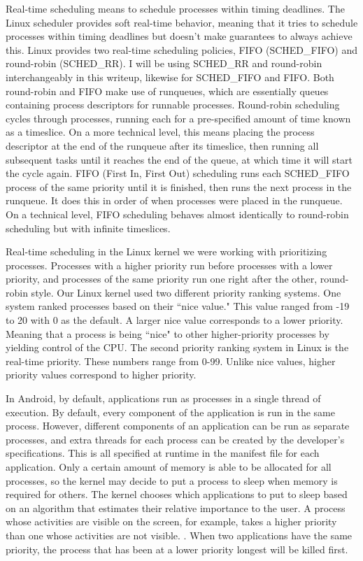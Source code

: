 \documentclass[letterpaper,10pt,titlepage]{article}
\newcommand{\ignore}[2]{\hspace{0in}#2} %
\begin{document}
Real-time scheduling means to schedule processes within timing deadlines. The Linux scheduler provides soft real-time behavior, meaning that it tries to schedule processes within timing deadlines but doesn't make guarantees to always achieve this. Linux provides two real-time scheduling policies, FIFO (SCHED\_FIFO) and round-robin (SCHED\_RR)\ignore{[Source: Linux Kernel Development, pg. 64]}. I will be using SCHED\_RR and round-robin interchangeably in this writeup, likewise for SCHED\_FIFO and FIFO. Both round-robin and FIFO make use of runqueues, which are essentially queues containing process descriptors for runnable processes. Round-robin scheduling cycles through processes, running each for a pre-specified amount of time known as a timeslice. On a more technical level, this means placing the process descriptor at the end of the runqueue after its timeslice, then running all subsequent tasks until it reaches the end of the queue, at which time it will start the cycle again. FIFO (First In, First Out) scheduling runs each SCHED\_FIFO process of the same priority until it is finished, then runs the next process in the runqueue. It does this in order of when processes were placed in the runqueue. On a technical level, FIFO scheduling behaves almost identically to round-robin scheduling but with infinite timeslices. \cite{Bovet}

Real-time scheduling in the Linux kernel we were working with prioritizing processes. Processes with a higher priority run before processes with a lower priority, and processes of the same priority run one right after the other, round-robin style. Our Linux kernel used two different priority ranking systems. One system ranked processes based on their ``nice value." This value ranged from -19 to 20 with 0 as the default. A larger nice value corresponds to a lower priority. Meaning that a process is being ``nice" to other higher-priority processes by yielding control of the CPU. The second priority ranking system in Linux is the real-time priority. These numbers range from 0-99. Unlike nice values, higher priority values correspond to higher priority. \cite{Love}

In Android, by default, applications run as processes in a single thread of execution. By default, every component of the application is run in the same process. However, different components of an application can be run as separate processes, and extra threads for each process can be created by the developer's specifications. This is all specified at runtime in the manifest file for each application. Only a certain amount of memory is able to be allocated for all processes, so the kernel may decide to put a process to sleep when memory is required for others. The kernel chooses which applications to put to sleep based on an algorithm that estimates their relative importance to the user. A process whose activities are visible on the screen, for example, takes a higher priority than one whose activities are not visible. \cite{AndroidDev1}. When two applications have the same priority, the process that has been at a lower priority longest will be killed first. \cite{SO1}
\end{document}
